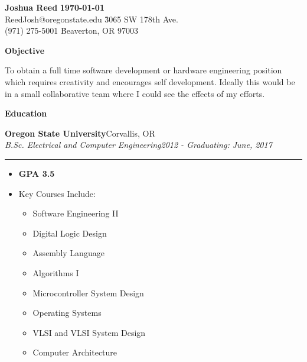 \documentclass[margin, line]{res}
\newcommand{\resheading}[1]{
  \begin{tcolorbox}[width=\textwidth,
                    frame hidden,
                    colback=black!30,
                    enhanced,
                    top=0pt,
                    bottom=0pt,
                    height=16pt
                    ]
      \bf #1
  \end{tcolorbox}
  }
\newcommand{\ressubheading}[4]{
  \begin{minipage}{\textwidth}
  {\textbf{#1}\hfill #2} \\
  {\textit{#3}\hfill \textit{#4}}
  \end{minipage}
  \rule{\textwidth}{1pt}
  }
\begin{document}

\begin{tabbing}
  \textbf{\Large Joshua Reed} \` \textbf{\today} \\
  ReedJosh@oregonstate.edu    \` 3065 SW 178th Ave. \\
  (971) 275-5001              \` Beaverton, OR 97003 \\ 
\end{tabbing}

\resheading{Objective}

To obtain a full time software development or hardware engineering position
which requires creativity and encourages self development. 
Ideally this would be in a small collaborative team where I could see the 
effects of my efforts.


\resheading{Education}

\ressubheading{Oregon State University}
              {Corvallis, OR}
              {B.Sc. Electrical and Computer Engineering}
              {2012 - Graduating: June, 2017}
\begin{itemize}[nolistsep, noitemsep, topsep=0pt]
  \item{\bf GPA 3.5}
  \item Key Courses Include:
    \setlength{\multicolsep}{0pt}
    \begin{multicols}{2}    
      \begin{itemize}[nolistsep,noitemsep,topsep=0pt]
        \item Software Engineering II
        \item Digital Logic Design  
        \item Assembly Language 
        \item Algorithms  I
        \item Microcontroller System Design 
        \item Operating Systems 
        \item VLSI and VLSI System Design 
        \item Computer Architecture 
      \end{itemize}
    \end{multicols}
\end{itemize}
\end{document}
